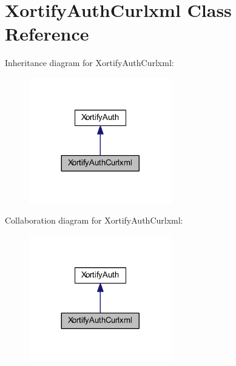 \hypertarget{class_xortify_auth_curlxml}{\section{Xortify\-Auth\-Curlxml Class Reference}
\label{class_xortify_auth_curlxml}
}


Inheritance diagram for Xortify\-Auth\-Curlxml\-:
\nopagebreak
\begin{figure}[H]
\begin{center}
\leavevmode
\includegraphics[width=176pt]{class_xortify_auth_curlxml__inherit__graph}
\end{center}
\end{figure}


Collaboration diagram for Xortify\-Auth\-Curlxml\-:
\nopagebreak
\begin{figure}[H]
\begin{center}
\leavevmode
\includegraphics[width=176pt]{class_xortify_auth_curlxml__coll__graph}
\end{center}
\end{figure}
